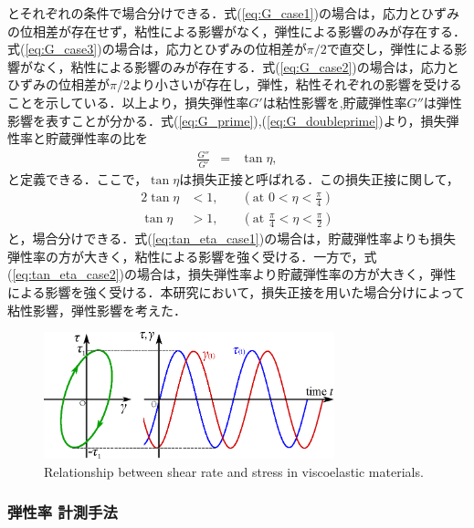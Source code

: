 とそれぞれの条件で場合分けできる．式(\ref{eq:G_case1})の場合は，応力とひずみの位相差が存在せず，粘性による影響がなく，弾性による影響のみが存在する．式(\ref{eq:G_case3})の場合は，応力とひずみの位相差が$\pi/2$で直交し，弾性による影響がなく，粘性による影響のみが存在する．式(\ref{eq:G_case2})の場合は，応力とひずみの位相差が$\pi/2$より小さいが存在し，弾性，粘性それぞれの影響を受けることを示している．以上より，損失弾性率$G'$は粘性影響を,貯蔵弾性率$G''$は弾性影響を表すことが分かる．式(\ref{eq:G_prime}),(\ref{eq:G_doubleprime})より，損失弾性率と貯蔵弾性率の比を
\begin{eqnarray}
    \frac{G''}{G'} &=& \tan\eta ,
    \label{eq:loss_factor}
\end{eqnarray}
と定義できる．ここで，$\tan\eta$は損失正接と呼ばれる\cite{生物レオロジー}\cite{化学者のためのレオロジー}．この損失正接に関して，
\begin{alignat}{2}
    \tan\eta & < 1, & \quad \left(\text{at } 0<\eta<\frac{\pi}{4}\right)     \label{eq:tan_eta_case1}         \\
    \tan\eta & > 1, & \quad \left(\text{at } \frac{\pi}{4}<\eta<\frac{\pi}{2}\right) \label{eq:tan_eta_case2}
\end{alignat}
と，場合分けできる．式(\ref{eq:tan_eta_case1})の場合は，貯蔵弾性率よりも損失弾性率の方が大きく，粘性による影響を強く受ける．一方で，式(\ref{eq:tan_eta_case2})の場合は，損失弾性率より貯蔵弾性率の方が大きく，弾性による影響を強く受ける．本研究において，損失正接を用いた場合分けによって粘性影響，弾性影響を考えた．

\begin{figure}[ht]
    \centering
    \includegraphics[width=0.75\textwidth]{2-Methods/elasticity.eps}
    \caption{Relationship between shear rate and stress in viscoelastic materials.}
    \label{fig:elastic}
\end{figure}

\newpage

\subsubsection{弾性率 計測手法}

